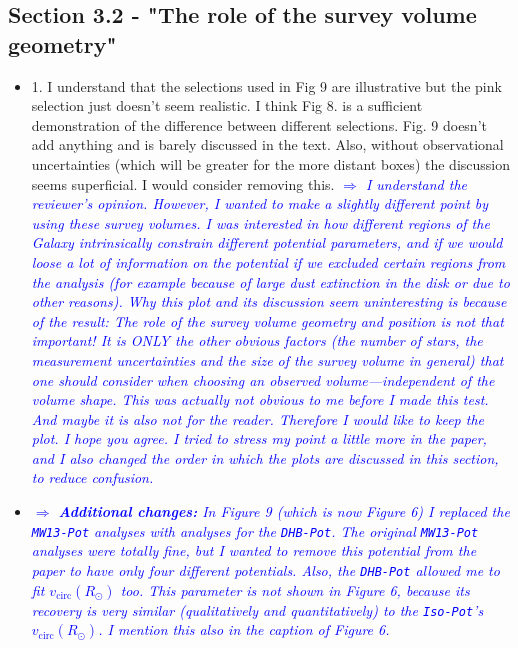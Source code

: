 \documentclass[10pt,a4paper]{article}
\newcommand{\Comment}[1]{\textsl{\textcolor{Blue}{$\Longrightarrow$ {#1}}}}
\begin{document}
\subsection{Section 3.2 - "The role of the survey volume geometry"}
\begin{itemize}
\item 1. I understand that the selections used in Fig 9 are illustrative but the pink selection just doesn't seem realistic. I think Fig 8. is a sufficient demonstration of the difference between different selections. Fig. 9 doesn't add anything and is barely discussed in the text. Also, without observational uncertainties (which will be greater for the more distant boxes) the discussion seems superficial. I would consider removing this. \Comment{I understand the reviewer's opinion. However, I wanted to make a slightly different point by using these survey volumes. I was interested in how different regions of the Galaxy intrinsically constrain different potential parameters, and if we would loose a lot of information on the potential if we excluded certain regions from the analysis (for example because of large dust extinction in the disk or due to other reasons). Why this plot and its discussion seem uninteresting is because of the result: The role of the survey volume geometry and position is not that important! It is ONLY the other obvious factors (the number of stars, the measurement uncertainties and the size of the survey volume in general) that one should consider when choosing an observed volume---independent of the volume shape. This was actually not obvious to me before I made this test. And maybe it is also not for the reader. Therefore I would like to keep the plot. I hope you agree. I tried to stress my point a little more in the paper, and I also changed the order in which the plots are discussed in this section, to reduce confusion.}
\item \Comment{\textbf{Additional changes:} In Figure 9 (which is now Figure 6) I replaced the \texttt{MW13-Pot} analyses with analyses for the \texttt{DHB-Pot}. The original \texttt{MW13-Pot} analyses were totally fine, but I wanted to remove this potential from the paper to have only four different potentials. Also, the \texttt{DHB-Pot} allowed me to fit $v_\text{circ}(R_\odot)$ too. This parameter is not shown in Figure 6, because its recovery is very similar (qualitatively and quantitatively) to the \texttt{Iso-Pot}'s $v_\text{circ}(R_\odot)$. I mention this also in the caption of Figure 6.}
\end{itemize}
\end{document}
